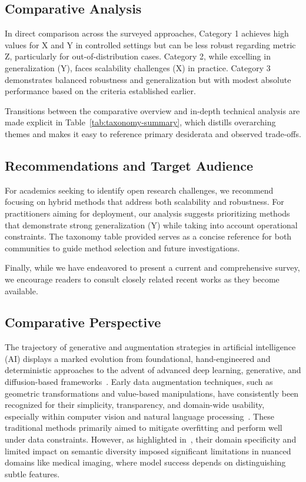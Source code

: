 \documentclass[sigconf]{acmart}
\begin{document}
\subsection{Comparative Analysis}

In direct comparison across the surveyed approaches, Category 1 achieves high values for X and Y in controlled settings but can be less robust regarding metric Z, particularly for out-of-distribution cases. Category 2, while excelling in generalization (Y), faces scalability challenges (X) in practice. Category 3 demonstrates balanced robustness and generalization but with modest absolute performance based on the criteria established earlier.

Transitions between the comparative overview and in-depth technical analysis are made explicit in Table~\ref{tab:taxonomy-summary}, which distills overarching themes and makes it easy to reference primary desiderata and observed trade-offs.

\subsection{Recommendations and Target Audience}

For academics seeking to identify open research challenges, we recommend focusing on hybrid methods that address both scalability and robustness. For practitioners aiming for deployment, our analysis suggests prioritizing methods that demonstrate strong generalization (Y) while taking into account operational constraints. The taxonomy table provided serves as a concise reference for both communities to guide method selection and future investigations.

Finally, while we have endeavored to present a current and comprehensive survey, we encourage readers to consult closely related recent works as they become available.

\subsection{Comparative Perspective}

The trajectory of generative and augmentation strategies in artificial intelligence (AI) displays a marked evolution from foundational, hand-engineered and deterministic approaches to the advent of advanced deep learning, generative, and diffusion-based frameworks~\cite{ref61,ref62,ref64,ref65,ref75,ref81,ref82,ref87,ref90,ref101,ref102}. Early data augmentation techniques, such as geometric transformations and value-based manipulations, have consistently been recognized for their simplicity, transparency, and domain-wide usability, especially within computer vision and natural language processing~\cite{ref61,ref62,ref64,ref65}. These traditional methods primarily aimed to mitigate overfitting and perform well under data constraints. However, as highlighted in~\cite{ref61,ref62,ref102}, their domain specificity and limited impact on semantic diversity imposed significant limitations in nuanced domains like medical imaging, where model success depends on distinguishing subtle features.
\end{document}
